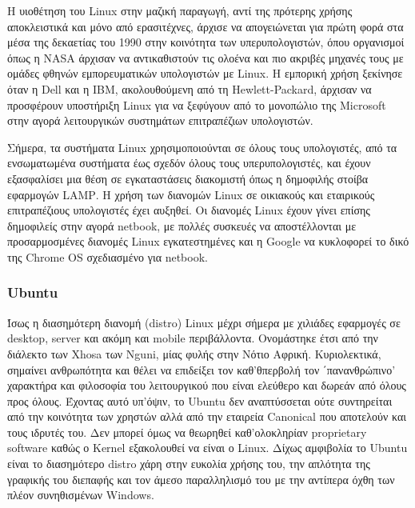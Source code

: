\documentclass[a4paper, 11pt]{article}
\begin{document}
{Η υιοθέτηση του Linux στην μαζική παραγωγή, αντί της πρότερης χρήσης αποκλειστικά και μόνο από ερασιτέχνες, άρχισε να απογειώνεται για πρώτη φορά στα μέσα της δεκαετίας του 1990 στην κοινότητα των υπερυπολογιστών, όπου οργανισμοί όπως η \textlatin{NASA} άρχισαν να αντικαθιστούν τις ολοένα και πιο ακριβές μηχανές τους με ομάδες φθηνών εμπορευματικών υπολογιστών με \textlatin{Linux}. Η εμπορική χρήση ξεκίνησε όταν η \textlatin{Dell} και η \textlatin{IBM}, ακολουθούμενη από τη \textlatin{Hewlett-Packard}, άρχισαν να προσφέρουν υποστήριξη \textlatin{Linux} για να ξεφύγουν από το μονοπώλιο της \textlatin{Microsoft} στην αγορά λειτουργικών συστημάτων επιτραπέζιων υπολογιστών.

Σήμερα, τα συστήματα \textlatin{Linux} χρησιμοποιούνται σε όλους τους υπολογιστές, από τα ενσωματωμένα συστήματα έως σχεδόν όλους τους υπερυπολογιστές, και έχουν εξασφαλίσει μια θέση σε εγκαταστάσεις διακομιστή όπως η δημοφιλής στοίβα εφαρμογών \textlatin{LAMP}. Η χρήση των διανομών \textlatin{Linux} σε οικιακούς και εταιρικούς επιτραπέζιους υπολογιστές έχει αυξηθεί. Οι διανομές \textlatin{Linux} έχουν γίνει επίσης δημοφιλείς στην αγορά netbook, με πολλές συσκευές να αποστέλλονται με προσαρμοσμένες διανομές \textlatin{Linux} εγκατεστημένες και η \textlatin{Google} να κυκλοφορεί το δικό της \textlatin{Chrome OS} σχεδιασμένο για \textlatin{netbook}. 


\subsubsection{\textlatin{Ubuntu}}
Ίσως η διασημότερη διανομή  \textlatin{(distro) Linux} μέχρι σήμερα με χιλιάδες εφαρμογές σε  \textlatin{desktop},  \textlatin{server} και ακόμη και  \textlatin{mobile} περιβάλλοντα. Ονομάστηκε έτσι από την διάλεκτο των  \textlatin{Xhosa} των  \textlatin{Nguni}, μίας φυλής στην Νότιο Αφρική. Κυριολεκτικά, σημαίνει ανθρωπότητα και θέλει να επιδείξει τον καθ'θπερβολή τον ΄πανανθρώπινο' χαρακτήρα και φιλοσοφία του λειτουργικού που είναι ελεύθερο και δωρεάν από όλους προς όλους. Έχοντας αυτό υπ'όψιν, το  \textlatin{Ubuntu} δεν αναπτύσσεται ούτε συντηρείται από την κοινότητα των χρηστών αλλά από την εταιρεία  \textlatin{Canonical} που αποτελούν και τους ιδρυτές του. Δεν μπορεί όμως να θεωρηθεί καθ'ολοκληρίαν  \textlatin{proprietary software} καθώς ο  \textlatin{Kernel} εξακολουθεί να είναι ο  \textlatin{Linux}. Δίχως αμφιβολία το  \textlatin{Ubuntu} είναι το διασημότερο  \textlatin{distro} χάρη στην ευκολία χρήσης του, την απλότητα της γραφικής του διεπαφής και τον άμεσο παραλληλισμό του με την αντίπερα όχθη των πλέον συνηθισμένων  \textlatin{Windows}.

}
\end{document}

